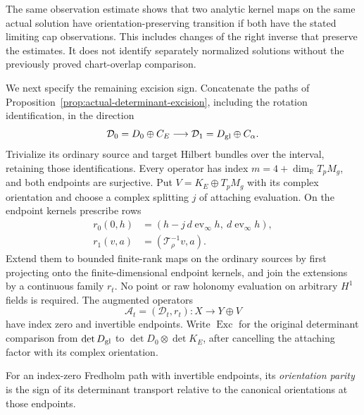 \documentclass[11pt]{amsart}
\theoremstyle{definition}
\theoremstyle{remark}
\theoremstyle{plain}
\begin{document}
The same observation estimate shows that two analytic kernel
maps on the same actual solution have orientation-preserving
transition if both have the stated limiting cap observations.
This includes changes of the right inverse that preserve the
estimates. It does not identify separately normalized solutions
without the previously proved chart-overlap comparison.

We next specify the remaining excision sign. Concatenate the
paths of Proposition~\ref{prop:actual-determinant-excision},
including the rotation identification, in the direction
\begin{equation}\label{eq:excision-oriented-path}
 \mathcal D_0=D_0\oplus C_E
       \longrightarrow \mathcal D_1=D_{\rm gl}\oplus C_\alpha.
\end{equation}
Trivialize its ordinary source and target Hilbert bundles over
the interval, retaining those identifications. Every operator
has index $m=4+\dim_{\mathbb R}T_pM_g$, and both endpoints
are surjective. Put $V=K_E\oplus T_pM_g$ with its complex
orientation and choose a complex splitting $j$ of attaching
evaluation. On the endpoint kernels prescribe rows
\begin{equation}\label{eq:excision-endpoint-rows}
 \begin{aligned}
 r_0(0,h)&=(h-j\,d\operatorname{ev}_\infty h,\
                                      d\operatorname{ev}_\infty h),\\
 r_1(v,a)&=(\mathcal T_\rho^{-1}v,a).
 \end{aligned}
\end{equation}
Extend them to bounded finite-rank maps on the ordinary sources
by first projecting onto the finite-dimensional endpoint kernels,
and join the extensions by a continuous family $r_t$.
No point or raw holonomy evaluation on arbitrary $H^1$ fields
is required. The augmented operators
\begin{equation}\label{eq:excision-index-zero-family}
             \mathcal A_t=(\mathcal D_t,r_t):
                          X\longrightarrow Y\oplus V
\end{equation}
have index zero and invertible endpoints.
Write $\operatorname{Exc}$ for the original determinant
comparison from $\det D_{\rm gl}$ to
$\det D_0\otimes\det K_E$, after cancelling the attaching
factor with its complex orientation.

For an index-zero Fredholm path with invertible endpoints, its
\emph{orientation parity} is the sign of its determinant transport
relative to the canonical orientations at those endpoints.
\end{document}

